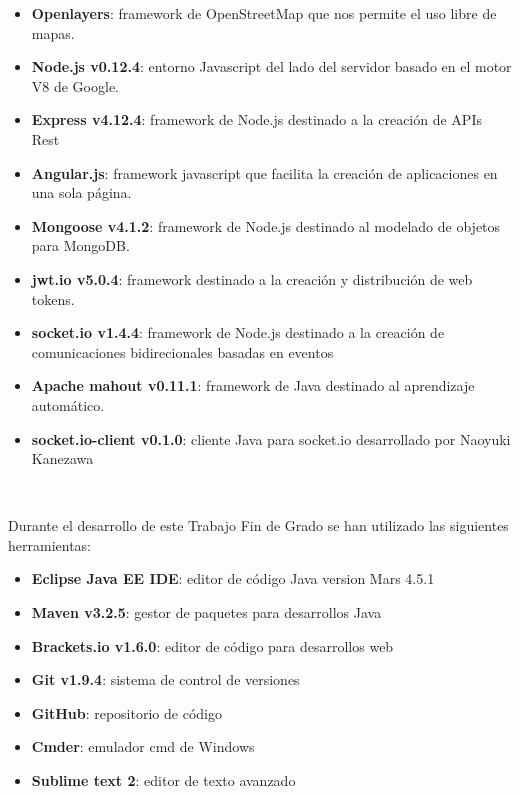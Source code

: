 \begin{itemize}
       \item {\bfseries Openlayers}: framework de OpenStreetMap que nos permite el uso libre de mapas.
       \item {\bfseries Node.js v0.12.4}: entorno Javascript del lado del servidor basado en el motor V8 de Google. 
       \item {\bfseries Express v4.12.4}: framework de Node.js destinado a la creación de APIs Rest
       \item {\bfseries Angular.js}: framework javascript que facilita la creación de aplicaciones en una sola página. 
       \item {\bfseries Mongoose v4.1.2}: framework de Node.js destinado al modelado de objetos para MongoDB.
       \item {\bfseries jwt.io v5.0.4}: framework destinado a la creación y distribución de web tokens. 
       \item {\bfseries socket.io v1.4.4}: framework de Node.js destinado a la creación de comunicaciones bidirecionales basadas en eventos
       \item {\bfseries Apache mahout v0.11.1}: framework de Java destinado al aprendizaje automático.
       \item {\bfseries socket.io-client v0.1.0}: cliente Java para socket.io desarrollado por Naoyuki Kanezawa
\end{itemize}

       \vspace{0.7cm}
\\
\thispagestyle{empty}

Durante el desarrollo de este Trabajo Fin de Grado se han utilizado las siguientes herramientas:

\begin{itemize}
       \item {\bfseries Eclipse Java EE IDE}: editor de código Java version Mars 4.5.1
       \item {\bfseries Maven v3.2.5}: gestor de paquetes para desarrollos Java
       \item {\bfseries Brackets.io v1.6.0}: editor de código para desarrollos web
       \item {\bfseries Git v1.9.4}: sistema de control de versiones
       \item {\bfseries GitHub}: repositorio de código
       \item {\bfseries Cmder}: emulador cmd de Windows 
       \item {\bfseries Sublime text 2}: editor de texto avanzado
\end{itemize}


